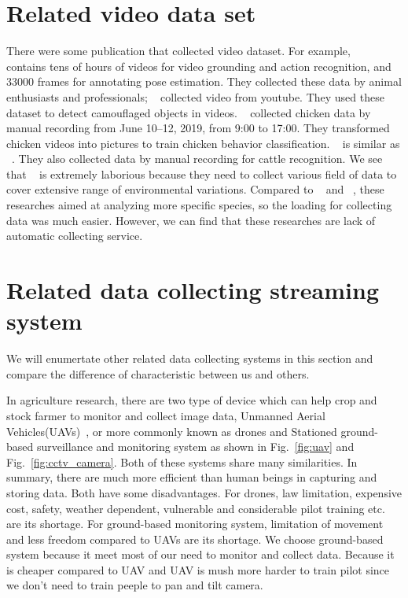 \section{Related video data set}
There were some publication that collected video dataset. For example, ~\cite{video-set-01} contains tens of hours of videos for video grounding and action recognition, and 33000 frames for annotating pose estimation. They collected these data by animal enthusiasts and professionals; ~\cite{video-set-02} collected video from youtube. They used these dataset to detect camouflaged objects in videos. ~\cite{video-set-03} collected chicken data by manual recording from June 10–12, 2019, from 9:00 to 17:00. They transformed chicken videos into pictures to train chicken behavior classification. ~\cite{video-set-04} is similar as ~\cite{video-set-03}. They also collected data by manual recording for cattle recognition. We see that ~\cite{video-set-01} is extremely laborious because they need to collect various field of data to cover extensive range of environmental variations. Compared to ~\cite{video-set-03} and ~\cite{video-set-04}, these researches aimed at analyzing more specific species, so the loading for collecting data was much easier. However, we can find that these researches are lack of automatic collecting service. 

\section{Related data collecting streaming system}
We will enumertate other related data collecting systems in this section and compare the difference of characteristic between us and others.

In agriculture research, there are two type of device which can help crop and stock farmer to monitor and collect image data, Unmanned Aerial Vehicles(UAVs)~\cite{uav-wiki}, or more commonly known as drones and Stationed ground-based surveillance and monitoring system as shown in Fig.~\ref{fig:uav} and Fig.~\ref{fig:cctv_camera}. Both of these systems share many similarities. In summary, there are much more efficient than human beings in capturing and storing data. Both have some disadvantages. For drones, law limitation, expensive cost, safety, weather dependent, vulnerable and considerable pilot training etc. are its shortage. For ground-based monitoring system, limitation of movement and less freedom compared to UAVs are its shortage. We choose ground-based system because it meet most of our need to monitor and collect data. Because it is cheaper compared to UAV and UAV is mush more harder to train pilot since we don't need to train peeple to pan and tilt camera.

